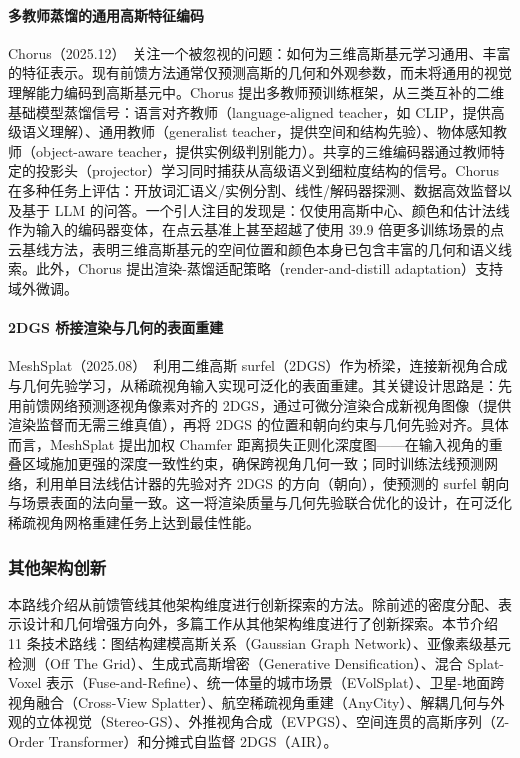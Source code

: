 \paragraph{多教师蒸馏的通用高斯特征编码}

Chorus（2025.12）~\cite{2512_17817}关注一个被忽视的问题：如何为三维高斯基元学习通用、丰富的特征表示。现有前馈方法通常仅预测高斯的几何和外观参数，而未将通用的视觉理解能力编码到高斯基元中。Chorus 提出多教师预训练框架，从三类互补的二维基础模型蒸馏信号：语言对齐教师（language-aligned teacher，如 CLIP，提供高级语义理解）、通用教师（generalist teacher，提供空间和结构先验）、物体感知教师（object-aware teacher，提供实例级判别能力）。共享的三维编码器通过教师特定的投影头（projector）学习同时捕获从高级语义到细粒度结构的信号。Chorus 在多种任务上评估：开放词汇语义/实例分割、线性/解码器探测、数据高效监督以及基于 LLM 的问答。一个引人注目的发现是：仅使用高斯中心、颜色和估计法线作为输入的编码器变体，在点云基准上甚至超越了使用 39.9 倍更多训练场景的点云基线方法，表明三维高斯基元的空间位置和颜色本身已包含丰富的几何和语义线索。此外，Chorus 提出渲染-蒸馏适配策略（render-and-distill adaptation）支持域外微调。

\paragraph{2DGS 桥接渲染与几何的表面重建}

MeshSplat（2025.08）~\cite{2508_17811}利用二维高斯 surfel（2DGS）作为桥梁，连接新视角合成与几何先验学习，从稀疏视角输入实现可泛化的表面重建。其关键设计思路是：先用前馈网络预测逐视角像素对齐的 2DGS，通过可微分渲染合成新视角图像（提供渲染监督而无需三维真值），再将 2DGS 的位置和朝向约束与几何先验对齐。具体而言，MeshSplat 提出加权 Chamfer 距离损失正则化深度图——在输入视角的重叠区域施加更强的深度一致性约束，确保跨视角几何一致；同时训练法线预测网络，利用单目法线估计器的先验对齐 2DGS 的方向（朝向），使预测的 surfel 朝向与场景表面的法向量一致。这一将渲染质量与几何先验联合优化的设计，在可泛化稀疏视角网格重建任务上达到最佳性能。

\subsubsection{其他架构创新}

本路线介绍从前馈管线其他架构维度进行创新探索的方法。除前述的密度分配、表示设计和几何增强方向外，多篇工作从其他架构维度进行了创新探索。本节介绍 11 条技术路线：图结构建模高斯关系（Gaussian Graph Network）、亚像素级基元检测（Off The Grid）、生成式高斯增密（Generative Densification）、混合 Splat-Voxel 表示（Fuse-and-Refine）、统一体量的城市场景（EVolSplat）、卫星-地面跨视角融合（Cross-View Splatter）、航空稀疏视角重建（AnyCity）、解耦几何与外观的立体视觉（Stereo-GS）、外推视角合成（EVPGS）、空间连贯的高斯序列（Z-Order Transformer）和分摊式自监督 2DGS（AIR）。

